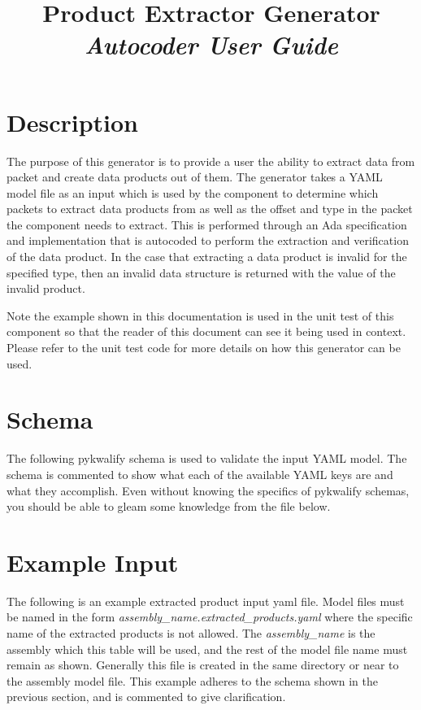 



\title{\textbf{Product Extractor Generator} \\
\large\textit{Autocoder User Guide}}
\date{}
\maketitle

\section{Description}

The purpose of this generator is to provide a user the ability to extract data from packet and create data products out of them. The generator takes a YAML model file as an input which is used by the component to determine which packets to extract data products from as well as the offset and type in the packet the component needs to extract. This is performed through an Ada specification and implementation that is autocoded to perform the extraction and verification of the data product. In the case that extracting a data product is invalid for the specified type, then an invalid data structure is returned with the value of the invalid product.

Note the example shown in this documentation is used in the unit test of this component so that the reader of this document can see it being used in context. Please refer to the unit test code for more details on how this generator can be used.

\section{Schema}

The following pykwalify schema is used to validate the input YAML model. The schema is commented to show what each of the available YAML keys are and what they accomplish. Even without knowing the specifics of pykwalify schemas, you should be able to gleam some knowledge from the file below.


\section{Example Input}

The following is an example extracted product input yaml file. Model files must be named in the form \textit{assembly\_name.extracted\_products.yaml} where the specific name of the extracted products is not allowed. The \textit{assembly\_name} is the assembly which this table will be used, and the rest of the model file name must remain as shown. Generally this file is created in the same directory or near to the assembly model file. This example adheres to the schema shown in the previous section, and is commented to give clarification.

